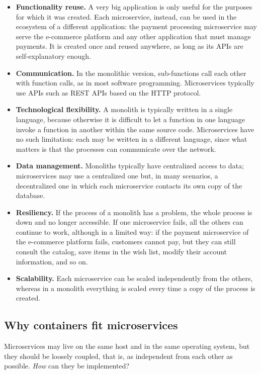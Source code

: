 \begin{itemize}
\item \textbf{Functionality reuse.} A very big application is only useful for the purposes for which it was created. Each microservice, instead, can be used in the ecosystem of a different application: the payment processing microservice may serve the e-commerce platform and any other application that must manage payments. It is created once and reused anywhere, as long as its APIs are self-explanatory enough.
\item \textbf{Communication.} In the monolithic version, sub-functions call each other with function calls, as in most software programming. Microservices typically use APIs such as REST APIs based on the HTTP protocol.
\item \textbf{Technological flexibility.} A monolith is typically written in a single language, because otherwise it is difficult to let a function in one language invoke a function in another within the same source code. Microservices have no such limitation: each may be written in a different language, since what matters is that the processes can communicate over the network.
\item \textbf{Data management.} Monoliths typically have centralized access to data; microservices may use a centralized one but, in many scenarios, a decentralized one in which each microservice contacts its own copy of the database.
\item \textbf{Resiliency.} If the process of a monolith has a problem, the whole process is down and no longer accessible. If one microservice fails, all the others can continue to work, although in a limited way: if the payment microservice of the e-commerce platform fails, customers cannot pay, but they can still consult the catalog, save items in the wish list, modify their account information, and so on.
\item \textbf{Scalability.} Each microservice can be scaled independently from the others, whereas in a monolith everything is scaled every time a copy of the process is created.
\end{itemize}

\subsection{Why containers fit microservices}

Microservices may live on the same host and in the same operating system, but they should be loosely coupled, that is, as independent from each other as possible. \emph{How} can they be implemented?

